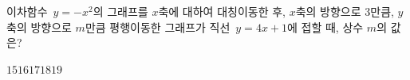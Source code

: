 이차함수~$y=-x^2$의 그래프를 $x$축에 대하여 대칭이동한 후, $x$축의 방향으로 $3$만큼, $y$축의 방향으로 $m$만큼 평행이동한 그래프가 직선~$y=4x+1$에 접할 때, 상수 $m$의 값은?
\begin{choices32}{$15$}{$16$}{$17$}{$18$}{$19$}\end{choices32}
